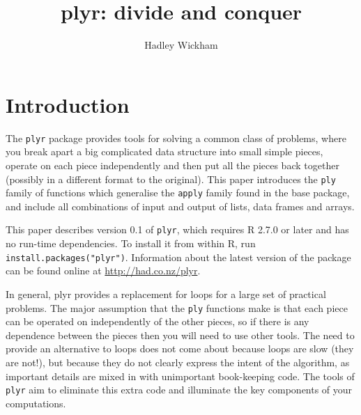 \documentclass[letterpaper,oneside]{scrartcl}
\title{plyr: divide and conquer}
\author{Hadley Wickham}
\begin{document}
\maketitle


\section{Introduction}

The {\tt plyr} package provides tools for solving a common class of problems, where you break apart a big complicated data structure into small simple pieces, operate on each piece independently and then put all the pieces back together (possibly in a different format to the original).  This paper introduces the {\tt ply} family of functions which generalise the {\tt apply} family found in the base package, and include all combinations of input and output of lists, data frames and arrays.

This paper describes version 0.1 of {\tt plyr}, which requires R 2.7.0 or later and has no run-time dependencies.  To install it from within R, run {\tt install.packages("plyr")}.  Information about the latest version of the package can be found online at \url{http://had.co.nz/plyr}.  


In general, plyr provides a replacement for loops for a large set of practical problems.  The major assumption that the {\tt ply} functions make is that each piece can be operated on independently of the other pieces, so if there is any dependence between the pieces then you will need to use other tools.  The need to provide an alternative to loops does not come about because loops are slow (they are not!), but because they do not clearly express the intent of the algorithm, as important details are mixed in with unimportant book-keeping code. The tools of {\tt plyr} aim to eliminate this extra code and illuminate the key components of your computations.
\end{document}
